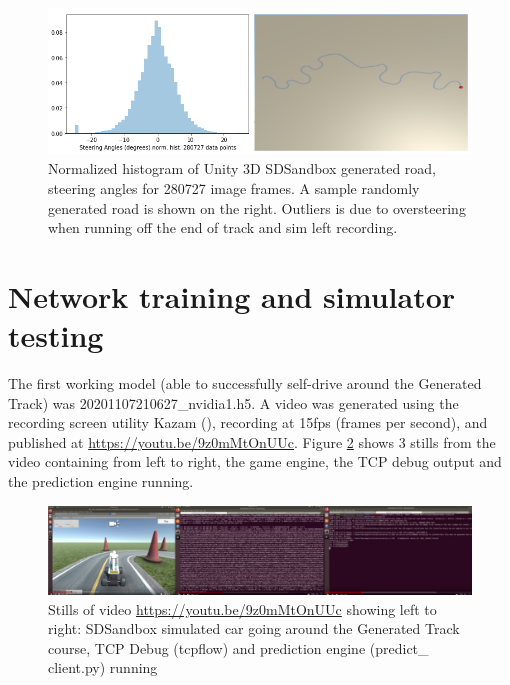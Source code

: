 \begin{figure}[ht]
 \centering 
 \includegraphics[width=\textwidth]{Figures/GeneratedRoadPlusHistogram.png}
 \caption{Normalized histogram of Unity 3D SDSandbox generated road, steering angles for 280727 image frames. A sample randomly generated road is shown on the right. Outliers is due to oversteering when running off the end of track and sim left recording.}
 \label{fig:GeneratedRoadPlusHist}
\end{figure}




\section{Network training and simulator testing}
\label{results:net-training} 
The first working model (able to successfully self-drive around the Generated Track) was   20201107210627\_nvidia1.h5. A video was generated using the recording screen utility Kazam (\cite{Kazam2020}), recording at 15fps (frames per second), and published at  \href{https://youtu.be/9z0mMtOnUUc}{https://youtu.be/9z0mMtOnUUc}. Figure \ref{fig:SimTCPPred}
shows 3 stills from the video containing from left to right, the game engine, the TCP debug output and the prediction engine running.

\begin{figure}[h!]
\centering
\includegraphics[width=\textwidth]{Figures/SimTCPPred.png}
\caption{Stills of video \href{https://youtu.be/9z0mMtOnUUc}{https://youtu.be/9z0mMtOnUUc} showing left to right: SDSandbox simulated car going around the Generated Track course, TCP Debug (tcpflow) and prediction engine (predict\_ client.py) running}
\label{fig:SimTCPPred}
\end{figure}

